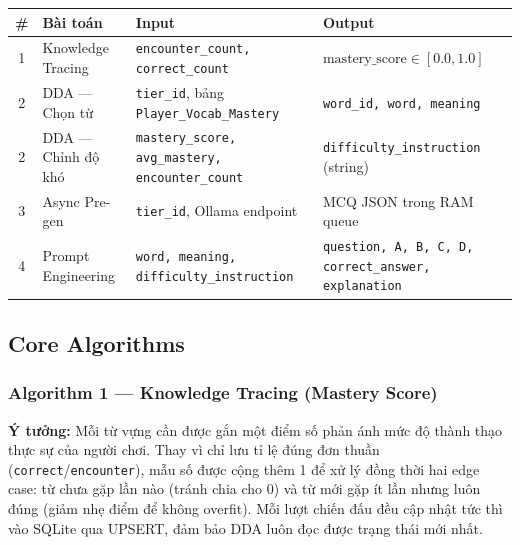 \begin{table}[h!]
\centering
\small
\begin{tabularx}{\textwidth}{|c|l|X|X|}
\toprule
\textbf{\#} & \textbf{Bài toán} & \textbf{Input} & \textbf{Output} \\
\midrule
1 & Knowledge Tracing & \texttt{encounter\_count, correct\_count} & $\text{mastery\_score} \in [0.0, 1.0]$ \\
2 & DDA — Chọn từ & \texttt{tier\_id}, bảng \texttt{Player\_Vocab\_Mastery} & \texttt{word\_id, word, meaning} \\
2 & DDA — Chỉnh độ khó & \texttt{mastery\_score, avg\_mastery, encounter\_count} & \texttt{difficulty\_instruction} (string) \\
3 & Async Pre-gen & \texttt{tier\_id}, Ollama endpoint & MCQ JSON trong RAM queue \\
4 & Prompt Engineering & \texttt{word, meaning, difficulty\_instruction} & \texttt{{question, A, B, C, D, correct\_answer, explanation }} \\
\bottomrule
\end{tabularx}
\end{table}

\subsection{Core Algorithms}

\subsubsection{Algorithm 1 — Knowledge Tracing (Mastery Score)}
\textbf{Ý tưởng:} Mỗi từ vựng cần được gắn một điểm số phản ánh mức độ thành thạo thực sự của người chơi. Thay vì chỉ lưu tỉ lệ đúng đơn thuần (\texttt{correct}/\texttt{encounter}), mẫu số được cộng thêm 1 để xử lý đồng thời hai edge case: từ chưa gặp lần nào (tránh chia cho 0) và từ mới gặp ít lần nhưng luôn đúng (giảm nhẹ điểm để không overfit). Mỗi lượt chiến đấu đều cập nhật tức thì vào SQLite qua UPSERT, đảm bảo DDA luôn đọc được trạng thái mới nhất.

